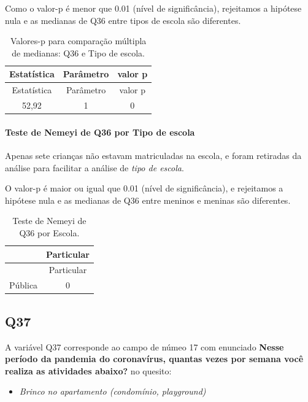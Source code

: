 \documentclass[]{article}
\providecommand{\tightlist}{%
  \setlength{\itemsep}{0pt}\setlength{\parskip}{0pt}}
\let\oldparagraph\paragraph
\renewcommand{\paragraph}[1]{\oldparagraph{#1}\mbox{}}
\begin{document}
Como o valor-p é menor que 0.01 (nível de significância), rejeitamos a hipótese nula e as medianas de Q36 entre tipos de escola são diferentes.

\begin{longtable}[]{@{}ccc@{}}
\caption{\label{tab:unnamed-chunk-1357}Valores-p para comparação múltipla de medianas: Q36 e Tipo de escola.}\tabularnewline
\toprule
Estatística & Parâmetro & valor p\tabularnewline
\midrule
\endfirsthead
\toprule
Estatística & Parâmetro & valor p\tabularnewline
\midrule
\endhead
52,92 & 1 & 0\tabularnewline
\bottomrule
\end{longtable}

\hypertarget{teste-de-nemeyi-de-q36-por-tipo-de-escola}{%
\paragraph{Teste de Nemeyi de Q36 por Tipo de escola}\label{teste-de-nemeyi-de-q36-por-tipo-de-escola}}

Apenas sete crianças não estavam matriculadas na escola, e foram retiradas da análise para facilitar a análise de \emph{tipo de escola}.

O valor-p é maior ou igual que 0.01 (nível de significância), e rejeitamos a hipótese nula e as medianas de Q36 entre meninos e meninas são diferentes.

\begin{longtable}[]{@{}lc@{}}
\caption{\label{tab:unnamed-chunk-1359}Teste de Nemeyi de Q36 por Escola.}\tabularnewline
\toprule
& Particular\tabularnewline
\midrule
\endfirsthead
\toprule
& Particular\tabularnewline
\midrule
\endhead
Pública & 0\tabularnewline
\bottomrule
\end{longtable}

\cleardoublepage

\hypertarget{q37}{%
\subsection{Q37}\label{q37}}

A variável Q37 corresponde ao campo de númeo 17 com enunciado \textbf{Nesse período da pandemia do coronavírus, quantas vezes por semana você realiza as atividades abaixo?} no quesito:

\begin{itemize}
\tightlist
\item
  \emph{Brinco no apartamento (condomínio, playground)}
\end{itemize}
\end{document}
